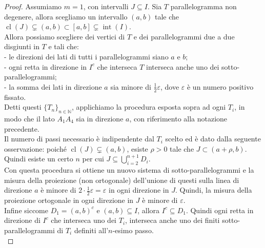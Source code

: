 \documentclass[a4paper, twoside,openright]{article}
\newcommand{\N}{\mathbb{N}}
\newcommand{\<}{\langle}
\renewcommand{\>}{\rangle}
\begin{document}
\begin{proof}
	Assumiamo $m=1$, con intervalli $J \subseteq I$. Sia $T$ parallelogramma non degenere, allora scegliamo un intervallo $(a, b)$ tale che $\operatorname{cl}(J) \subsetneq(a, b) \subset[a, b] \subsetneq \operatorname{int}(I)$.\\
	Allora possiamo scegliere dei vertici di $T$ e dei parallelogrammi due a due disgiunti in $T$ e tali che:\\
	- le direzioni dei lati di tutti i parallelogrammi siano $a$ e $b$;\\
	- ogni retta in direzione in $I^c$ che interseca $T$ interseca anche uno dei sotto-parallelogrammi;\\
	- la somma dei lati in direzione $a$ sia minore di $\frac{1}{2} \varepsilon$, dove $\varepsilon$ è un numero positivo fissato.\\
	Detti questi $\{T_n\}_{n \in \N}$, applichiamo la procedura esposta sopra ad ogni $T_i$, in modo che il lato $A_1A_4$ sia in direzione $a$, con riferimento alla notazione precedente.\\
	Il numero di passi necessario è indipendente dal $T_i$ scelto ed è dato dalla seguente osservazione: poiché $\operatorname{cl}(J) \subsetneq(a, b)$, esiste $\rho >0$ tale che $J \subset (a+\rho,b)$. Quindi esiste un certo $n$ per cui $J \subseteq \bigcup_{i=2}^{n+1}D_i$.\\
	Con questa procedura si ottiene un nuovo sistema di sotto-parallelogrammi e la misura della proiezione (non ortogonale) dell'unione di questi sulla linea di direzione $a$ è minore di $2 \cdot \frac{1}{2} \varepsilon=\varepsilon$ in ogni direzione in $J$. Quindi, la misura della proiezione ortogonale in ogni direzione in $J$ è minore di $\varepsilon$.\\
	Infine siccome $D_1 =(a,b)^c$ e $(a,b) \subseteq I$, allora $I^c \subseteq D_1$. Quindi ogni retta in direzione di $I^c$ che interseca uno dei $T_i$, interseca anche uno dei finiti sotto-parallelogrammi di $T_i$ definiti all'$n$-esimo passo.\\
\end{proof}

\end{document}

